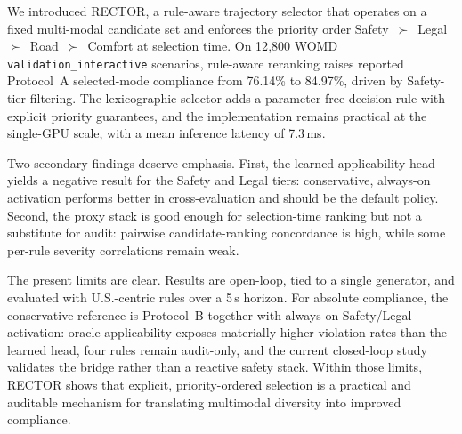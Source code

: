 We introduced \textsc{RECTOR}, a rule-aware trajectory selector that operates on a fixed multi-modal candidate set and enforces the priority order Safety~$\succ$~Legal~$\succ$~Road~$\succ$~Comfort at selection time. On 12{,}800 WOMD \texttt{validation\_interactive} scenarios, rule-aware reranking raises reported Protocol~A selected-mode compliance from 76.14\% to 84.97\%, driven by Safety-tier filtering. The lexicographic selector adds a parameter-free decision rule with explicit priority guarantees, and the implementation remains practical at the single-GPU scale, with a mean inference latency of 7.3\,ms.

Two secondary findings deserve emphasis. First, the learned applicability head yields a negative result for the Safety and Legal tiers: conservative, always-on activation performs better in cross-evaluation and should be the default policy. Second, the proxy stack is good enough for selection-time ranking but not a substitute for audit: pairwise candidate-ranking concordance is high, while some per-rule severity correlations remain weak.

The present limits are clear. Results are open-loop, tied to a single generator, and evaluated with U.S.-centric rules over a 5\,s horizon. For absolute compliance, the conservative reference is Protocol~B together with always-on Safety/Legal activation: oracle applicability exposes materially higher violation rates than the learned head, four rules remain audit-only, and the current closed-loop study validates the bridge rather than a reactive safety stack. Within those limits, RECTOR shows that explicit, priority-ordered selection is a practical and auditable mechanism for translating multimodal diversity into improved compliance.
